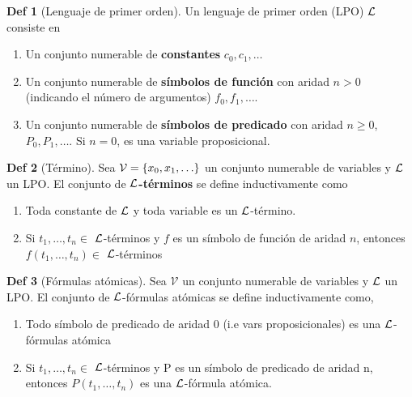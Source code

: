 \documentclass{report}
\theoremstyle{definition} %
\newtheorem*{definition*}{Def}
\begin{document}
\begin{definition*}[Lenguaje de primer orden]
    Un lenguaje de primer orden (LPO) $\mathcal{L}$ consiste en
    \begin{enumerate}
        \item Un conjunto numerable de \textbf{constantes} $c_0, c_1, \dots$
        \item Un conjunto numerable de \textbf{símbolos de función} con aridad
        $n > 0$ (indicando el número de argumentos) $f_0, f_1, \dots$.
        \item Un conjunto numerable de \textbf{símbolos de predicado} con aridad
        $n \geq 0$, $P_0, P_1, \dots$. Si $n = 0$, es una variable
        proposicional.
    \end{enumerate}
\end{definition*}

\begin{definition*}[Término]
    Sea $\mathcal{V} = \set{x_0, x_1, \dots}$ un conjunto numerable de variables
    y $\mathcal{L}$ un LPO. El conjunto de \textbf{$\mathcal{L}$-términos}
    se define inductivamente como

    \begin{enumerate}
        \item Toda constante de $\mathcal{L}$ y toda variable es un $\mathcal{L}$-término.
        \item Si $t_1, \dots, t_n \in$ $\mathcal{L}$-términos y $f$ es un símbolo de
        función de aridad $n$, entonces $f(t_1, \dots, t_n) \in$ $\mathcal{L}$-términos
    \end{enumerate}
\end{definition*}

\begin{definition*}[Fórmulas atómicas]
    Sea $\mathcal{V}$ un conjunto numerable de variables y $\mathcal{L}$ un LPO. El
    conjunto de $\mathcal{L}$-fórmulas atómicas se define inductivamente como,

    \begin{enumerate}
        \item Todo símbolo de predicado de aridad 0 (i.e vars proposicionales)
        es una $\mathcal{L}$-fórmulas atómica
        \item Si $t_1, \dots, t_n \in$ $\mathcal{L}$-términos y P es un símbolo de
        predicado de aridad n, entonces $P(t_1, \dots, t_n)$ es una
        $\mathcal{L}$-fórmula atómica.
    \end{enumerate}
    
\end{definition*}
\end{document}
